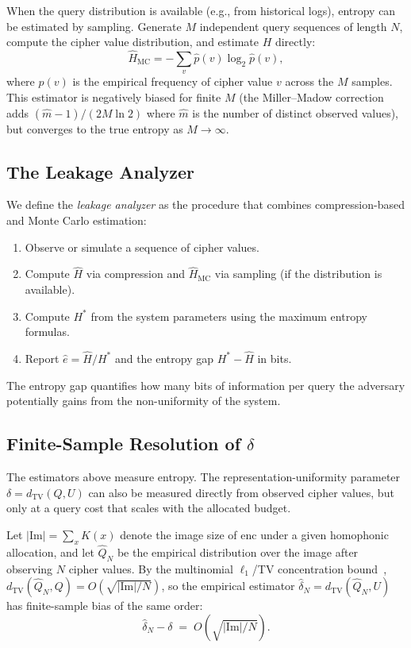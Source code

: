 \documentclass[11pt]{article}
\theoremstyle{definition}
\theoremstyle{plain}
\theoremstyle{remark}
\newcommand{\enc}{\mathrm{enc}}
\newcommand{\im}{\mathrm{Im}}
\newcommand{\TV}{d_{\mathrm{TV}}}
\begin{document}
When the query distribution is available (e.g., from historical logs),
entropy can be estimated by sampling.  Generate $M$ independent query
sequences of length $N$, compute the cipher value distribution, and
estimate $H$ directly:
\begin{equation}
\hat{H}_{\mathrm{MC}} = -\sum_v \hat{p}(v) \log_2 \hat{p}(v),
\end{equation}
where $\hat{p}(v)$ is the empirical frequency of cipher value $v$ across
the $M$ samples.  This estimator is negatively biased for finite $M$
(the Miller--Madow correction adds $(\hat{m} - 1) / (2M \ln 2)$ where
$\hat{m}$ is the number of distinct observed values), but converges to
the true entropy as $M \to \infty$.

\subsection{The Leakage Analyzer}

We define the \emph{leakage analyzer} as the procedure that combines
compression-based and Monte Carlo estimation:
\begin{enumerate}
\item Observe or simulate a sequence of cipher values.
\item Compute $\hat{H}$ via compression and $\hat{H}_{\mathrm{MC}}$ via
  sampling (if the distribution is available).
\item Compute $H^*$ from the system parameters using the maximum entropy
  formulas.
\item Report $\hat{e} = \hat{H} / H^*$ and the entropy gap
  $H^* - \hat{H}$ in bits.
\end{enumerate}
The entropy gap quantifies how many bits of information per query the
adversary potentially gains from the non-uniformity of the system.

\subsection{Finite-Sample Resolution of \texorpdfstring{$\delta$}{delta}}
\label{subsec:finite-sample}

The estimators above measure entropy.  The representation-uniformity
parameter $\delta = \TV(Q, U)$ can also be measured directly from
observed cipher values, but only at a query cost that scales with the
allocated budget.

Let $|\im| = \sum_x K(x)$ denote the image size of $\enc$ under a given
homophonic allocation, and let $\hat{Q}_N$ be the empirical
distribution over the image after observing $N$ cipher values.  By the
multinomial $\ell_1$/TV concentration
bound~\cite{devroye1996nonparametric},
$\TV(\hat{Q}_N, Q) = O(\sqrt{|\im|/N})$, so the
empirical estimator $\hat{\delta}_N = \TV(\hat{Q}_N, U)$ has
finite-sample bias of the same order:
\begin{equation}
\hat{\delta}_N - \delta \;=\; O\!\left(\sqrt{|\im|/N}\right).
\label{eq:finite-sample-bias}
\end{equation}
\end{document}
